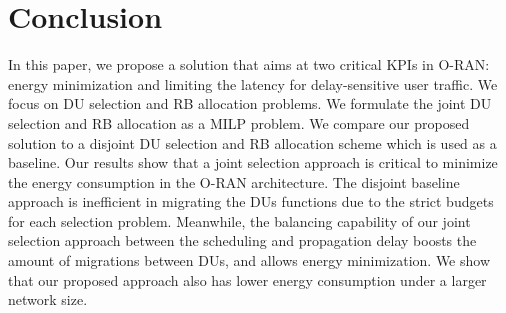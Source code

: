 \documentclass[conference]{IEEEtran}
\begin{document}
\section{Conclusion}
\par In this paper, we propose a solution that aims at two critical KPIs in O-RAN: energy minimization and limiting the latency for delay-sensitive user traffic. We focus on DU selection and RB allocation problems. We formulate the joint DU selection and RB allocation as a MILP problem. We compare our proposed solution to a disjoint DU selection and RB allocation scheme which is used as a baseline. Our results show that a joint selection approach is critical to minimize the energy consumption in the O-RAN architecture. The disjoint baseline approach is inefficient in migrating the DUs functions due to the strict budgets for each selection problem. Meanwhile, the balancing capability of our joint selection approach between the scheduling and propagation delay boosts the amount of migrations between DUs, and allows energy minimization. We show that our proposed approach also has lower energy consumption under a larger network size.


\end{document}
